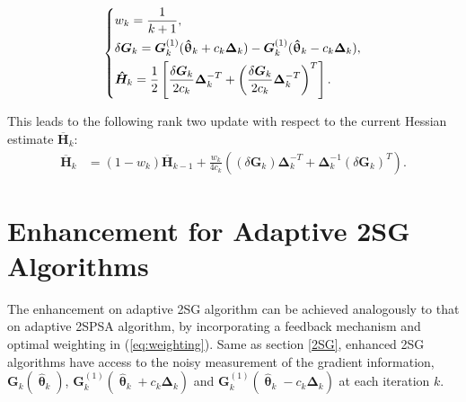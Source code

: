 \documentclass[conference]{IEEEtran}
\newcommand{\bG}{\bm{G}}
\newcommand{\bDelta}{\bm{\Delta}}
\newcommand{\oH}{\bm{\overline{H}}}
\newcommand{\hH}{\bm{\hat{H}}}
\newcommand{\htheta}{\bm{\hat{\uptheta}}}
\newcommand{\remove}[1]{}
\begin{document}
\begin{equation} \label{eq:notationSG}
  \begin{dcases}
    w_k=\frac{1}{k+1},\\
    \delta\bG_k=\bG_k^{(1)}(\htheta_k+ c_k\bDelta_k)-\bG_k^{(1)}(\htheta_k- c_k\bDelta_k),\\
    \hH_k=\frac{1}{2}\left[ \frac{\delta\bG_k}{2c_k}\bDelta_k^{-T}+\left(\frac{\delta\bG_k}{2c_k}\bDelta_k^{-T}\right)^T \right].\\
  \end{dcases}
\end{equation}

This leads to the following rank two update with respect to
the current Hessian estimate $\oH_k$:
\begin{align*}
\oH_k &= (1 - w_k) \oH_{k-1} + \frac{w_k}{4c_k} ((\delta\bG_k)\bDelta_k^{-T}+\bDelta_k^{-1}(\delta\bG_k)^{T}).
\end{align*} \remove{ Above gives a rank-two update from $
  \oH_{k-1}^{-1} $ to $ \oH_{k}^{-1} $. Write the sequential recursions
  for the $ \oH_k^{-1} $ as following:
  \begin{equation} \label{eq:2SGSequentialUpdate}
    \begin{dcases} \bm{B}_k^{-1}
      &=\frac{k+1}{k}\oH_{k-1}^{-1}-(\frac{k+1}{k})^2\oH_{k-1}^{-1}(\delta\bG_k)\\
      &~~~\cdot(b_k^{-1}+\frac{k+1}{k}\bDelta_k^{-T}\oH_{k-1}^{-1}(\delta\bG_k)\bDelta_k^{-T}\oH_{k-1}^{-1}\\
      \oH_k^{-1} &=\bm{B}_k^{-1}-\bm{B}_k^{-1}\bDelta_k^{-1}\\
      &~~~\cdot(b_k^{-1}+(\delta\bG_k)^{T}\bm{B}_k^{-1}\bDelta_k^{-1})^{-1}(\delta\bG_k)^{T}\bm{B}_k^{-1}
    \end{dcases}
  \end{equation} where
  \begin{equation}\label{eq:2SGB}
    \bm{B}_k=\frac{k}{k+1}\oH_{k-1}+b_k(\delta\bG_k)\bDelta_k^{-T}
  \end{equation}}

\section{Enhancement for Adaptive 2SG Algorithms}  \label{Enhanced 2SG}
 The enhancement on adaptive 2SG algorithm can be achieved analogously to that on adaptive 2SPSA algorithm, by incorporating a feedback
 mechanism and optimal weighting in (\ref{eq:weighting}). Same as section \ref{2SG}, enhanced 2SG algorithms have access
 to the noisy measurement of the gradient information,
 $\bG_k(\htheta_k)$, $\bG_k^{(1)}(\htheta_k+ c_k\bDelta_k)$ and
 $\bG_k^{(1)}(\htheta_k- c_k\bDelta_k)$ at each iteration $k$.
\end{document}
